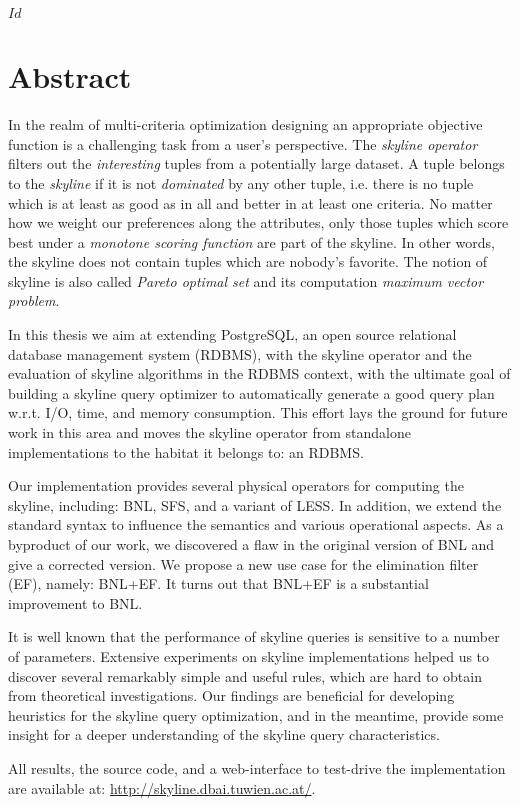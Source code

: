 
\svnInfo $Id$


\chapter*{Abstract\revision}


In the realm of multi-criteria optimization designing an appropriate
objective function is a challenging task from a user's perspective.
%
The \emph{skyline operator} filters out the \emph{interesting} tuples
from a potentially large dataset.  A tuple belongs to the \emph{skyline} if
it is not \emph{dominated} by any other tuple, i.e. there is no tuple
which is at least as good as in all and better in at least one criteria.
%
No matter how we weight our preferences along the attributes, only
those tuples which score best under a \emph{monotone scoring function} are
part of the skyline.
%
In other words, the skyline does not contain tuples which
are nobody's favorite.
%
The notion of skyline is also called \emph{Pareto optimal set} and its
computation \emph{maximum vector problem}.


In this thesis we aim at extending PostgreSQL, an open source
relational database management system (RDBMS), with the skyline
operator and the evaluation of skyline algorithms in the RDBMS
context, with the ultimate goal of building a skyline query optimizer
to automatically generate a good query plan w.r.t. I/O, time, and
memory consumption.
%
This effort lays the ground for future work in this area and moves the
skyline operator from standalone implementations to the habitat it
belongs to: an RDBMS.


Our implementation provides several physical operators for computing
the skyline, including: BNL, SFS, and a variant of LESS.
%
In addition, we extend the standard syntax to influence the
semantics and various operational aspects.
%
As a byproduct of our work, we discovered a flaw in the original
version of BNL and give a corrected version.
%
We propose a new use case for the elimination filter (EF), namely:
BNL+EF. It turns out that BNL+EF is a substantial improvement to BNL.

It is well known that the performance of skyline queries is sensitive
to a number of parameters.  
%
Extensive experiments on skyline implementations helped us to discover
several remarkably simple and useful rules, which are hard to obtain
from theoretical investigations.
%
Our findings are beneficial for developing heuristics for the skyline
query optimization, and in the meantime, provide some insight for a
deeper understanding of the skyline query characteristics.

All results, the source code, and a web-interface to test-drive the
implementation are available at:
\url{http://skyline.dbai.tuwien.ac.at/}.
